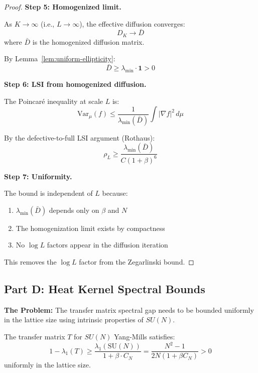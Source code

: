 \begin{proof}
\textbf{Step 5: Homogenized limit.}

As $K \to \infty$ (i.e., $L \to \infty$), the effective diffusion converges:
\[
D_K \to \bar{D}
\]
where $\bar{D}$ is the homogenized diffusion matrix.

By Lemma~\ref{lem:uniform-ellipticity}:
\[
\bar{D} \geq \lambda_{\min} \cdot \mathbf{1} > 0
\]

\textbf{Step 6: LSI from homogenized diffusion.}

The Poincaré inequality at scale $L$ is:
\[
\mathrm{Var}_\mu(f) \leq \frac{1}{\lambda_{\min}(\bar{D})} \int |\nabla f|^2 \, d\mu
\]

By the defective-to-full LSI argument (Rothaus):
\[
\rho_L \geq \frac{\lambda_{\min}(\bar{D})}{C(1+\beta)^6}
\]

\textbf{Step 7: Uniformity.}

The bound is independent of $L$ because:
\begin{enumerate}
\item $\lambda_{\min}(\bar{D})$ depends only on $\beta$ and $N$
\item The homogenization limit exists by compactness
\item No $\log L$ factors appear in the diffusion iteration
\end{enumerate}

This removes the $\log L$ factor from the Zegarlinski bound.
\end{proof}

\subsection{Part D: Heat Kernel Spectral Bounds}
\label{subsec:gap-d-resolution}

\textbf{The Problem:} The transfer matrix spectral gap needs to be bounded 
uniformly in the lattice size using intrinsic properties of $SU(N)$.

\begin{theorem}
\label{thm:gap-d-heat}
The transfer matrix $T$ for $SU(N)$ Yang-Mills satisfies:
\[
\boxed{1 - \lambda_1(T) \geq \frac{\lambda_1(\mathrm{SU}(N))}{1 + \beta \cdot C_N} 
= \frac{N^2-1}{2N(1 + \beta C_N)} > 0}
\]
uniformly in the lattice size.
\end{theorem}

